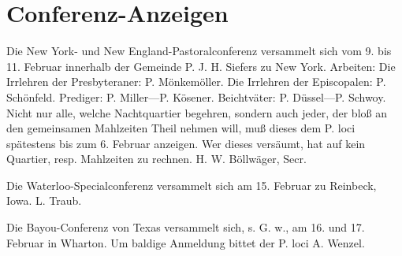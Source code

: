 \chapter{Conferenz-Anzeigen}

Die New York- und New England-Pastoralconferenz versammelt sich vom 9. bis 11. Februar innerhalb der Gemeinde P. J. H. Siefers zu New York. Arbeiten: Die Irrlehren der Presbyteraner: P. Mönkemöller. Die Irrlehren der Episcopalen: P. Schönfeld. Prediger: P. Miller—P. Kösener. Beichtväter: P. Düssel—P. Schwoy. Nicht nur alle, welche Nachtquartier begehren, sondern auch jeder, der bloß an den gemeinsamen Mahlzeiten Theil nehmen will, muß dieses dem P. loci spätestens bis zum 6. Februar anzeigen. Wer dieses versäumt, hat auf kein Quartier, resp. Mahlzeiten zu rechnen. H. W. Böllwäger, Secr.

Die Waterloo-Specialconferenz versammelt sich am 15. Februar zu Reinbeck, Iowa. L. Traub.

Die Bayou-Conferenz von Texas versammelt sich, s. G. w., am 16. und 17. Februar in Wharton. Um baldige Anmeldung bittet der P. loci A. Wenzel.
